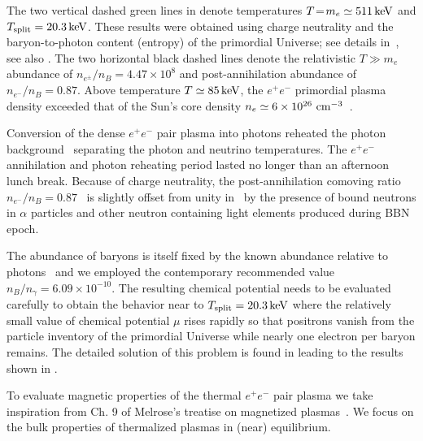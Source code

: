 The two vertical dashed green lines in  denote temperatures $T\!=\!m_{e}\simeq511\text{\,keV}$ and $T_\mathrm{split}=20.3\text{\,keV}$. These results were obtained using charge neutrality and the baryon-to-photon content (entropy) of the primordial Universe; see details in~\cite{Rafelski:2023emw}, see also . The two horizontal black dashed lines denote the relativistic $T\gg m_e$ abundance of $n_{e^{\pm}}/n_{B}=4.47\times10^{8}$ and post-annihilation abundance of $n_{e^{-}}/n_{B}=0.87$. Above temperature $T\simeq85\text{\,keV}$, the $e^{+}e^{-}$ primordial plasma density exceeded that of the Sun's core density $n_{e}\simeq6\times10^{26}{\rm\ cm}^{-3}$~\cite{Bahcall:2001smc}. 

Conversion of the dense $e^{+}e^{-}$ pair plasma into photons reheated the photon background~\cite{Birrell:2014uka} separating the photon and neutrino temperatures. The $e^{+}e^{-}$ annihilation and photon reheating period lasted no longer than an afternoon lunch break. Because of charge neutrality, the post-annihilation comoving ratio $n_{e^{-}}/n_{B}=0.87$~\cite{Rafelski:2023emw} is slightly offset from unity in~ by the presence of bound neutrons in $\alpha$ particles and other neutron containing light elements produced during BBN epoch.

The abundance of baryons is itself fixed by the known abundance relative to photons~\cite{ParticleDataGroup:2022pth} and we employed the contemporary recommended value $n_B/n_\gamma=6.09\times 10^{-10}$. The resulting chemical potential needs to be evaluated carefully to obtain the behavior near to $T_\mathrm{split}=20.3\text{\,keV}$ where the relatively small value of chemical potential $\mu$ rises rapidly so that positrons vanish from the particle inventory of the primordial Universe while nearly one electron per baryon remains. The detailed solution of this problem is found in \cite{Fromerth:2012fe,Rafelski:2023emw} leading to the results shown in .

\noindent To evaluate magnetic properties of the thermal $e^{+}e^{-}$ pair plasma we take inspiration from Ch. 9 of Melrose's treatise on magnetized plasmas~\cite{melrose2008quantum}. We focus on the bulk properties of thermalized plasmas in (near) equilibrium.

